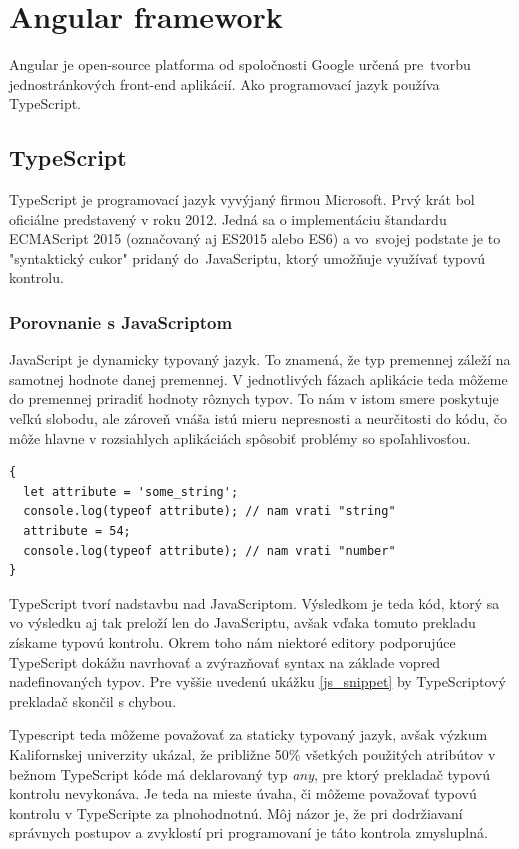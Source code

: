 \documentclass[
  digital, %
  twoside, %
  notable,   %
  nolof,   %
  nolot,   %
]{fithesis3}
\newcommand{\inquotes}[1]{{}"{}#1{}"{}}
\begin{document}
\chapter{Angular framework}
Angular je open-source platforma od spoločnosti Google určená pre~tvorbu jednostránkových front-end aplikácií. Ako programovací jazyk používa TypeScript.

\section{TypeScript}
TypeScript je programovací jazyk vyvýjaný firmou Microsoft. Prvý krát bol oficiálne predstavený v roku 2012. Jedná sa o implementáciu štandardu ECMAScript 2015 (označovaný aj ES2015 alebo ES6) a vo~svojej podstate je to \inquotes{syntaktický cukor} pridaný do~JavaScriptu, ktorý umožňuje využívať typovú kontrolu.

\subsection{Porovnanie s JavaScriptom}
JavaScript je dynamicky typovaný jazyk. To znamená, že typ premennej záleží na samotnej hodnote danej premennej. V jednotlivých fázach aplikácie teda môžeme do premennej priradiť hodnoty rôznych typov. To nám v istom smere poskytuje veľkú slobodu, ale zároveň vnáša istú mieru nepresnosti a neurčitosti do kódu, čo môže hlavne v rozsiahlych aplikáciách spôsobiť problémy so spoľahlivosťou.

\begin{lstlisting}[caption={Kód v JavaScripte},captionpos=b,label=js_snippet]
{
  let attribute = 'some_string';
  console.log(typeof attribute); // nam vrati "string"
  attribute = 54;
  console.log(typeof attribute); // nam vrati "number"
}
\end{lstlisting}

TypeScript tvorí nadstavbu nad JavaScriptom. Výsledkom je teda kód, ktorý sa vo výsledku aj tak preloží len do JavaScriptu, avšak vďaka tomuto prekladu získame typovú kontrolu. Okrem toho nám niektoré editory podporujúce TypeScript dokážu navrhovať a zvýrazňovať syntax na základe vopred nadefinovaných typov. Pre vyššie uvedenú ukážku \ref{js_snippet} by TypeScriptový prekladač skončil s chybou.

Typescript teda môžeme považovať za staticky typovaný jazyk, avšak výzkum Kalifornskej univerzity\cite{ray2014large} ukázal, že približne 50\% všetkých použitých atribútov v bežnom TypeScript kóde má deklarovaný typ \textit{any}, pre ktorý prekladač typovú kontrolu nevykonáva. Je teda na mieste úvaha, či môžeme považovať typovú kontrolu v TypeScripte za plnohodnotnú. Môj názor je, že pri dodržiavaní správnych postupov a zvyklostí pri programovaní je táto kontrola zmysluplná.
\end{document}
